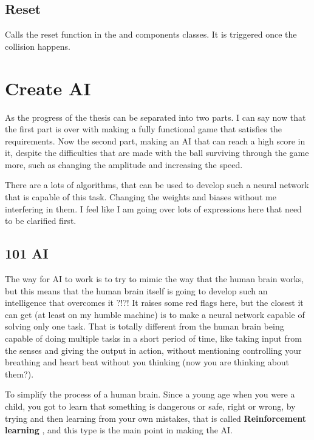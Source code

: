 \subsection{Reset}
Calls the reset function in the  and  components classes. It is triggered once the collision happens.

\section{Create AI}\label{create-ai}

As the progress of the thesis can be separated into two parts. I can say now that the first part is over with making a fully functional game that satisfies the requirements. Now the second part, making an AI that can reach a high score in it, despite the difficulties that are made with the ball surviving through the game more, such as changing the amplitude and increasing the speed.

There are a lots of algorithms, that can be used to develop such a neural network that is capable of this task. Changing the weights and biases without me interfering in them. I feel like I am going over lots of expressions here that need to be clarified first.

\subsection{101 AI}\label{sec:101-ai}
The way for AI to work is to try to mimic the way that the human brain works, but this means that the human brain itself is going to develop such an intelligence that overcomes it ?!?! It raises some red flags here, but the closest it can get (at least on my humble machine) is to make a neural network capable of solving only one task. That is totally different from the human brain being capable of doing multiple tasks in a short period of time, like taking input from the senses and giving the output in action, without mentioning controlling your breathing and heart beat without you thinking (now you are thinking about them?).

To simplify the process of a human brain. Since a young age when you were a child, you got to learn that something is dangerous or safe, right or wrong, by trying and then learning from your own mistakes, that is called \textbf{Reinforcement learning} \cite{Supervised_vs_Unsupervised_vs_Reinforcement_Learning}, and this type is the main point in making the AI.

